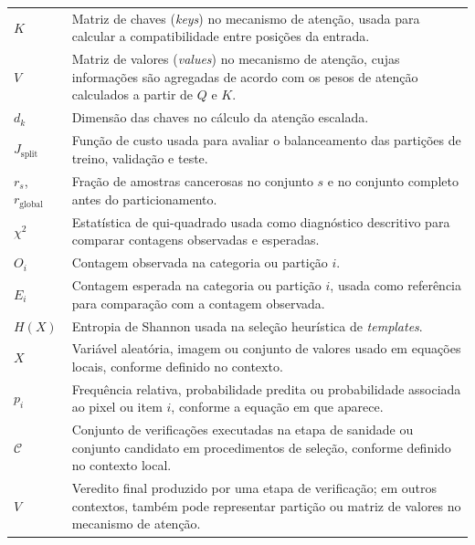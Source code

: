 \begin{longtable}{p{3.0cm}p{12.0cm}}
  $K$ &
  Matriz de chaves (\textit{keys}) no mecanismo de atenção, usada para calcular
  a compatibilidade entre posições da entrada.\\

  $V$ &
  Matriz de valores (\textit{values}) no mecanismo de atenção, cujas informações
  são agregadas de acordo com os pesos de atenção calculados a partir de $Q$ e
  $K$.\\

  $d_k$ &
  Dimensão das chaves no cálculo da atenção escalada.\\

  $J_{\mathrm{split}}$ &
  Função de custo usada para avaliar o balanceamento das partições de treino,
  validação e teste.\\

  $r_s$, $r_{\mathrm{global}}$ &
  Fração de amostras cancerosas no conjunto $s$ e no conjunto completo antes do
  particionamento.\\

  $\chi^2$ &
  Estatística de qui-quadrado usada como diagnóstico descritivo para comparar
  contagens observadas e esperadas.\\

  $O_i$ &
  Contagem observada na categoria ou partição $i$.\\

  $E_i$ &
  Contagem esperada na categoria ou partição $i$, usada como referência para
  comparação com a contagem observada.\\

  $H(X)$ &
  Entropia de Shannon usada na seleção heurística de \textit{templates}.\\

  $X$ &
  Variável aleatória, imagem ou conjunto de valores usado em equações locais,
  conforme definido no contexto.\\

  $p_i$ &
  Frequência relativa, probabilidade predita ou probabilidade associada ao pixel
  ou item $i$, conforme a equação em que aparece.\\

  $\mathcal{C}$ &
  Conjunto de verificações executadas na etapa de sanidade ou conjunto candidato
  em procedimentos de seleção, conforme definido no contexto local.\\

  $V$ &
  Veredito final produzido por uma etapa de verificação; em outros contextos,
  também pode representar partição ou matriz de valores no mecanismo de atenção.\\


\end{longtable}
